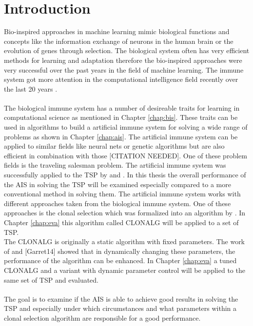 %
%
% 
% 
% 


\chapter{Introduction}
\label{chap:intro}

Bio-inspired approaches in machine learning mimic biological functions and concepts like the information exchange of neurons in the human brain or the evolution of genes through selection. The biological system often has very efficient methods for learning and adaptation therefore the bio-inspired approaches were very successful over the past years in the field of machine learning. The immune system got more attention in the computational intelligence field recently over the last 20 years \cite{tan2016artificial}.\\\\
The biological immune system has a number of desireable traits for learning in computational science as mentioned in Chapter \ref{chap:bis}. These traits can be used in algorithms to build a artificial immune system for solving a wide range of problems as shown in Chapter \ref{chap:ais}. The artificial immune system can be applied to similar fields like neural nets or genetic algorithms but are also efficient in combination with those [CITATION NEEDED]. One of these problem fields is the traveling salesman problem. The artificial immune system was successfully applied to the TSP by \cite{DEC02} and \cite{sun}. In this thesis the overall performance of the AIS in solving the TSP will be examined especially compared to a more conventional method in solving them. The artificial immune system works with different approaches taken from the biological immune system. One of these approaches is the clonal selection which was formalized into an algorithm by \cite{DEC02}. In Chapter \ref{chap:eva} this algorithm called CLONALG will be applied to a set of TSP.\\
The CLONALG is originally a static algorithm with fixed parameters. The work of \cite{RIFF09} and [Garret14] showed that in dynamically changing these parameters, the performance of the algorithm can be enhanced. In Chapter \ref{chap:eva} a tuned CLONALG and a variant with dynamic parameter control will be applied to the same set of TSP and evaluated.\\\\
The goal is to examine if the AIS is able to achieve good results in solving the TSP and especially under which circumstances and what parameters within a clonal selection algorithm are responsible for a good performance.



